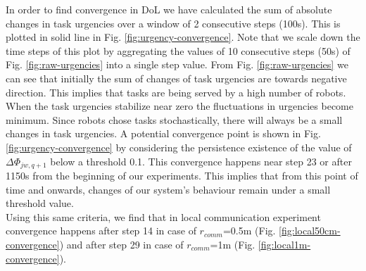 \documentclass[letterpaper, 10 pt, conference]{ieeeconf}  %
\begin{document}
%
In order to find convergence in DoL we have calculated the sum of absolute changes in task urgencies over a window of 2 consecutive steps (100s). This is plotted in solid line in Fig. \ref{fig:urgency-convergence}. Note that we scale down the time steps of this plot by aggregating the values of 10 consecutive steps (50s) of Fig. \ref{fig:raw-urgencies} into a single step value.
From Fig. \ref{fig:raw-urgencies} we can see that initially the sum of changes of task urgencies are towards negative direction. This implies that tasks are being served by a high number of robots. When the task urgencies stabilize near zero the fluctuations in urgencies become minimum. Since robots chose tasks stochastically, there will always be a small changes in task urgencies. A potential convergence point is shown in Fig. \ref{fig:urgency-convergence} by considering the persistence existence of the value of $\Delta \Phi_{jw, q+1}$ below a threshold 0.1. This convergence happens near step 23 or after 1150s from the beginning of our experiments. This implies that from this point of time and onwards, changes of our system's behaviour remain under a small threshold value.\\
Using this same criteria, we find that in local communication experiment convergence happens after step 14 in case of $r_{comm}$=0.5m (Fig. \ref{fig:local50cm-convergence}) and after step 29 in case of $r_{comm}$=1m (Fig. \ref{fig:local1m-convergence}).\\ 
\end{document}
